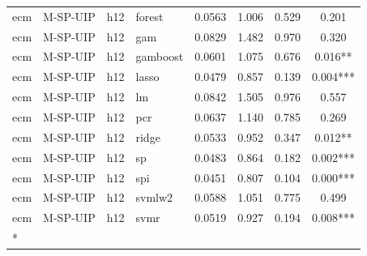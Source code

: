 \begin{ThreePartTable}
\begin{longtable}[t]{llclcccc}
ecm & M-SP-UIP & h12 & forest & 0.0563 & 1.006 & 0.529 & 0.201\\
ecm & M-SP-UIP & h12 & gam & 0.0829 & 1.482 & 0.970 & 0.320\\
ecm & M-SP-UIP & h12 & gamboost & 0.0601 & 1.075 & 0.676 & 0.016**\\
ecm & M-SP-UIP & h12 & lasso & 0.0479 & 0.857 & 0.139 & 0.004***\\
ecm & M-SP-UIP & h12 & lm & 0.0842 & 1.505 & 0.976 & 0.557\\
ecm & M-SP-UIP & h12 & pcr & 0.0637 & 1.140 & 0.785 & 0.269\\
ecm & M-SP-UIP & h12 & ridge & 0.0533 & 0.952 & 0.347 & 0.012**\\
ecm & M-SP-UIP & h12 & sp & 0.0483 & 0.864 & 0.182 & 0.002***\\
ecm & M-SP-UIP & h12 & spi & 0.0451 & 0.807 & 0.104 & 0.000***\\
ecm & M-SP-UIP & h12 & svmlw2 & 0.0588 & 1.051 & 0.775 & 0.499\\
ecm & M-SP-UIP & h12 & svmr & 0.0519 & 0.927 & 0.194 & 0.008***\\*
\end{longtable}
\end{ThreePartTable}
\endgroup{}
